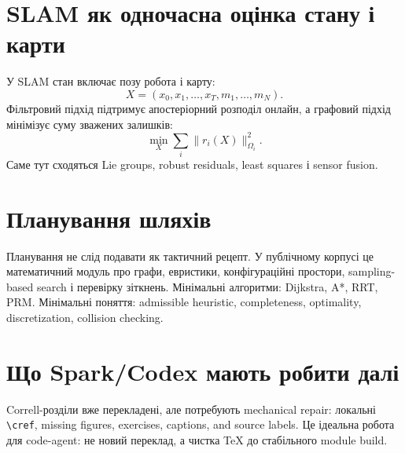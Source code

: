 \section{SLAM як одночасна оцінка стану і карти}

У SLAM стан включає позу робота і карту:
\begin{equation}
  X=(x_0,x_1,\ldots,x_T,m_1,\ldots,m_N).
\end{equation}
Фільтровий підхід підтримує апостеріорний розподіл онлайн, а графовий підхід мінімізує суму зважених залишків:
\begin{equation}
  \min_X \sum_i \|r_i(X)\|^2_{\Omega_i}.
\end{equation}
Саме тут сходяться Lie groups, robust residuals, least squares і sensor fusion.

\section{Планування шляхів}

Планування не слід подавати як тактичний рецепт. У публічному корпусі це математичний модуль про графи, евристики, конфігураційні простори, sampling-based search і перевірку зіткнень. Мінімальні алгоритми: Dijkstra, A*, RRT, PRM. Мінімальні поняття: admissible heuristic, completeness, optimality, discretization, collision checking.

\section{Що Spark/Codex мають робити далі}

Correll-розділи вже перекладені, але потребують mechanical repair: локальні \texttt{\textbackslash cref}, missing figures, exercises, captions, and source labels. Це ідеальна робота для code-agent: не новий переклад, а чистка TeX до стабільного module build.
